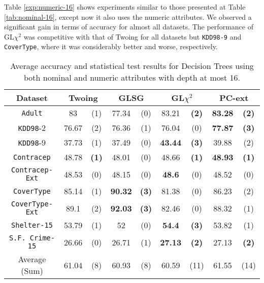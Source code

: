 Table \ref{exp:numeric-16}
shows experiments  similar to those presented at Table \ref{tab:nominal-16}, except now it also uses the numeric attributes.
We observed a significant gain in terms of accuracy for almost all datasets. 
The performance of GL$\chi^2$ was competitive with that of Twoing for all datasets but {\tt KDD98-9} and {\tt CoverType}, where it was
considerably better and worse, respectively.


\begin{table}
\small
\caption{Average accuracy and statistical test results for  Decision Trees using both nominal and numeric attributes with depth at most 16.}
\centering
\begin{tabular}{c|cc|cc|cc|cc} 
Dataset              &        \multicolumn{2}{c|}{Twoing} &   \multicolumn{2}{c|}{GLSG} &   \multicolumn{2}{c|}{GL$\chi^2$} & \multicolumn{2}{c}{PC-ext}  \\  \hline   
{\tt Adult}          &  83            &  (1)              &  77.34      &  (0)          &  83.21       &  {\bf (2)}         & {\bf 83.28} & {\bf (2)}     \\
{\tt KDD98}-2        &  76.67         &  (2)              &  76.36      &  (1)          &  76.04       &  (0)               & {\bf 77.87} & {\bf (3)}     \\
{\tt KDD98}-9        &  37.73         &  (1)              &  37.49      &  (0)          &  {\bf 43.44} &  {\bf (3)}         &  39.88      & (2)           \\
{\tt Contracep}      &  48.78         &  {\bf (1)}        &  48.01      &  (0)          &  48.66       &  {\bf (1)}         & {\bf 48.93} & {\bf (1)}     \\
{\tt Contracep-Ext}  &  48.53         &  (0)              &  48.15      &  (0)          &  {\bf 48.6}  &  (0)               &  48.52      & (0)           \\
{\tt CoverType}      &  85.14         &  (1)              &  {\bf 90.32}&  {\bf (3)}    &  81.38       &  (0)               &  86.23      & (2)           \\
{\tt CoverType-Ext}  &  89.1          &  (2)              &  {\bf 92.03}&  {\bf (3)}    &  82.46       &  (0)               &  88.32      & (1)           \\
{\tt Shelter-15}     &  53.79         &  (1)              &  52         &  (0)          &  {\bf 54.4}  &  {\bf (3)}         &  53.82      & (1)           \\   
{\tt S.F. Crime-15}  &  26.66         &  (0)              &  26.71      &  (1)          &  {\bf 27.13} &  {\bf (2)}         &  27.13      & {\bf (2)}     \\
\hline
Average (Sum)        &   61.04        &  (8)              & 60.93       &  (8)          &   60.59      &  (11)              &  61.55      & (14)


\end{tabular}
\end{table}
